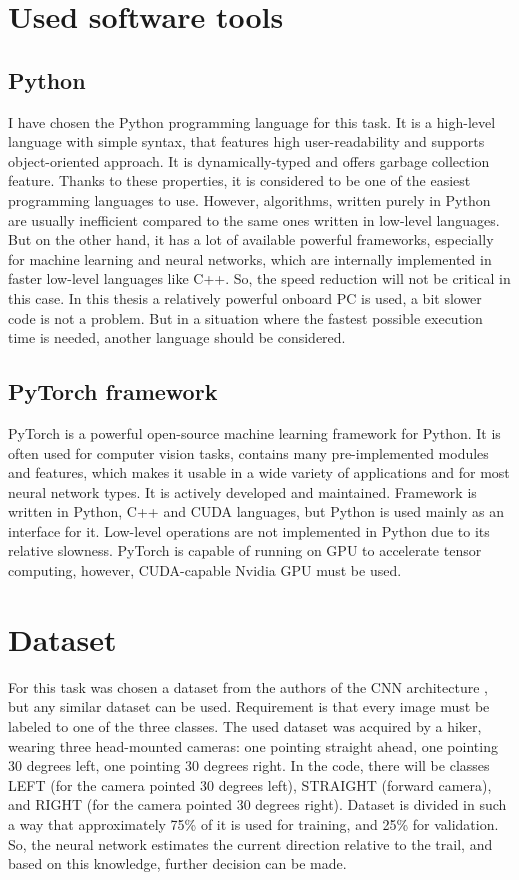 \section{Used software tools}

\subsection{Python}

I have chosen the Python programming language for this task. It is a high-level language with simple syntax, that features high user-readability and supports object-oriented approach. It is dynamically-typed and offers garbage collection feature. Thanks to these properties, it is considered to be one of the easiest programming languages to use. However, algorithms, written purely in Python are usually inefficient compared to the same ones written in low-level languages. But on the other hand, it has a lot of available powerful frameworks, especially for machine learning and neural networks, which are internally implemented in faster low-level languages like C++. So, the speed reduction will not be critical in this case. In this thesis a relatively powerful onboard PC is used, a bit slower code is not a problem. But in a situation where the fastest possible execution time is needed, another language should be considered. 

\subsection{PyTorch framework}

PyTorch is a powerful open-source machine learning framework for Python. It is often used for computer vision tasks, contains many pre-implemented modules and features, which makes it usable in a wide variety of applications and for most neural network types. It is actively developed and maintained. Framework is written in Python, C++ and CUDA languages, but Python is used mainly as an interface for it. Low-level operations are not implemented in Python due to its relative slowness. PyTorch is capable of running on \acs{GPU} to accelerate tensor computing, however, CUDA-capable Nvidia \acs{GPU} must be used. 


\section{Dataset}

For this task was chosen a dataset from the authors of the \acs{CNN} architecture \cite{giusti2016machine}, but any similar dataset can be used. Requirement is that every image must be labeled to one of the three classes. The used dataset was acquired by a hiker, wearing three head-mounted cameras: one pointing straight ahead, one pointing 30 degrees left, one pointing 30 degrees right. In the code, there will be classes LEFT (for the camera pointed 30 degrees left), STRAIGHT (forward camera), and RIGHT (for the camera pointed 30 degrees right). Dataset is divided in such a way that approximately 75\% of it is used for training, and 25\% for validation. So, the neural network estimates the current direction relative to the trail, and based on this knowledge, further decision can be made.

